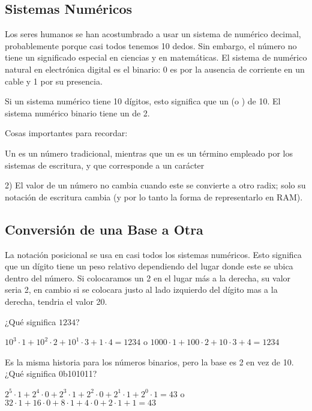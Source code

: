 \subsection{Sistemas Numéricos}

Los seres humanos se han acostumbrado a usar un sistema de numérico decimal, probablemente porque casi todos tenemos 10 dedos.
Sin embargo, el número  no tiene un significado especial en ciencias y en matemáticas.
El sistema de numérico natural en electrónica digital es el binario: 0 es por la ausencia de corriente en un cable y 1 por su presencia.

Si un sistema numérico tiene 10 dígitos, esto significa que un  (o ) de 10.
El sistema numérico binario tiene un  de 2.

Cosas importantes para recordar:

Un  es un número tradicional, mientras que un  es un término empleado por los sistemas de escritura, y que corresponde a un carácter

2) El valor de un número no cambia cuando este se convierte a otro radix; solo su notación de escritura cambia (y por lo tanto la forma de representarlo en \ac {RAM}).

\subsection{Conversión de una Base a Otra}

La notación posicional se usa en casi todos los sistemas numéricos. Esto significa que un dígito tiene un peso relativo dependiendo del lugar donde este se ubica dentro del número.
Si colocaramos un 2 en el lugar más a la derecha, su valor seria 2, en cambio si se colocara justo al lado izquierdo del dígito mas a la derecha, tendria el valor 20.

¿Qué significa $1234$?

$10^3 \cdot 1 + 10^2 \cdot 2 + 10^1 \cdot 3 + 1 \cdot 4 = 1234$ o
$1000 \cdot 1 + 100 \cdot 2 + 10 \cdot 3 + 4 = 1234$

Es la misma historia para los números binarios, pero la base es 2 en vez de 10.
¿Qué significa 0b101011?

$2^5 \cdot 1 + 2^4 \cdot 0 + 2^3 \cdot 1 + 2^2 \cdot 0 + 2^1 \cdot 1 + 2^0 \cdot 1 = 43$ o
$32 \cdot 1 + 16 \cdot 0 + 8 \cdot 1 + 4 \cdot 0 + 2 \cdot 1 + 1 = 43$

